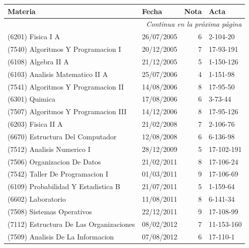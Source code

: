 \documentclass[a4paper,11pt]{article}
\begin{document}
\begin{longtable}{|l|l|r|l|}
  \hline
  Materia                                       & Fecha      & Nota & Acta              \\
  \hline
  \endhead

  \hline
  \multicolumn{4}{r}{\textit{Continua en la próxima página}} \\
  \endfoot

  \hline
  \endlastfoot

  (6201) Fisica I A                          & 26/07/2005 & 6  & 2-104-20          \\
  (7540) Algoritmos Y Programacion I         & 20/12/2005 & 7  & 17-93-191         \\
  (6108) Algebra II A                        & 21/12/2005 & 5  & 1-150-126         \\
  (6103) Analisis Matematico II A            & 25/07/2006 & 4  & 1-151-98          \\
  (7541) Algoritmos Y Programacion II        & 14/08/2006 & 8  & 17-95-50          \\
  (6301) Quimica                             & 17/08/2006 & 6  & 3-73-44           \\
  (7507) Algoritmos Y Programacion III       & 14/12/2006 & 8  & 17-95-126         \\
  (6203) Fisica II A                         & 21/02/2008 & 7  & 2-106-76          \\
  (6670) Estructura Del Computador           & 12/08/2008 & 6  & 6-136-98          \\
  (7512) Analisis Numerico I                 & 28/12/2009 & 5  & 17-102-191        \\
  (7506) Organizacion De Datos               & 21/02/2011 & 8  & 17-106-24         \\
  (7542) Taller De Programacion I            & 01/03/2011 & 9  & 17-106-69         \\
  (6109) Probabilidad Y Estadistica B        & 21/07/2011 & 5  & 1-159-64          \\
  (6602) Laboratorio                         & 11/08/2011 & 8  & 6-141-34          \\
  (7508) Sistemas Operativos                 & 22/12/2011 & 9  & 17-108-99         \\
  (7112) Estructura De Las Organizaciones    & 08/02/2012 & 7  & 11-153-160        \\
  (7509) Analisis De La Informacion          & 07/08/2012 & 6  & 17-110-1          \\

\end{longtable}
\end{document}
